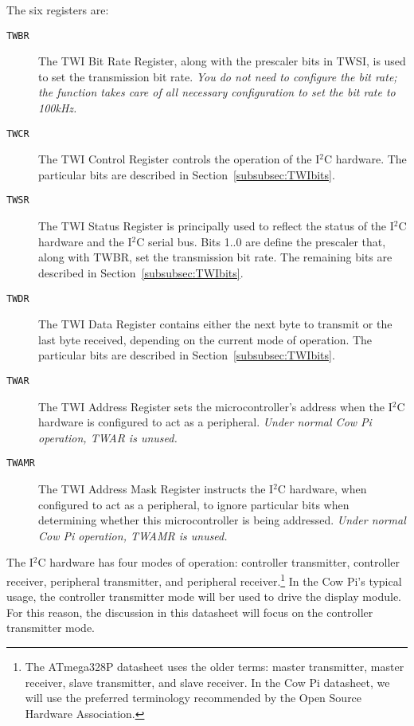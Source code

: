 The six registers are:
\begin{description}
    \item[\texttt{TWBR}] The TWI Bit Rate Register, along with the prescaler bits in TWSI, is used to set the transmission bit rate.
                         \textit{You do not need to configure the bit rate; the  function takes care of all necessary configuration to set the bit rate to 100kHz.}
    \item[\texttt{TWCR}] The TWI Control Register controls the operation of the I$^2$C hardware.
                         The particular bits are described in Section~\ref{subsubsec:TWIbits}.
    \item[\texttt{TWSR}] The TWI Status Register is principally used to reflect the status of the I$^2$C hardware and the I$^2$C serial bus.
                         Bits 1..0 are define the prescaler that, along with TWBR, set the transmission bit rate.
                         The remaining bits are described in Section~\ref{subsubsec:TWIbits}.
    \item[\texttt{TWDR}] The TWI Data Register contains either the next byte to transmit or the last byte received, depending on the current mode of operation.
                         The particular bits are described in Section~\ref{subsubsec:TWIbits}.
    \item[\texttt{TWAR}] The TWI Address Register sets the microcontroller's address when the I$^2$C hardware is configured to act as a peripheral.
                         \textit{Under normal Cow Pi operation, TWAR is unused.}
    \item[\texttt{TWAMR}] The TWI Address Mask Register instructs the I$^2$C hardware, when configured to act as a peripheral, to ignore particular bits when determining whether this microcontroller is being addressed.
                          \textit{Under normal Cow Pi operation, TWAMR is unused.}
\end{description}

The I$^2$C hardware has four modes of operation: controller transmitter, controller receiver, peripheral transmitter, and peripheral receiver.\footnote{
    The ATmega328P datasheet uses the older terms: master transmitter, master receiver, slave transmitter, and slave receiver.
    In the Cow Pi datasheet, we will use the preferred terminology recommended by the Open Source Hardware Association.}
In the Cow Pi's typical usage, the controller transmitter mode will ber used to drive the display module.
For this reason, the discussion in this datasheet will focus on the controller transmitter mode.

